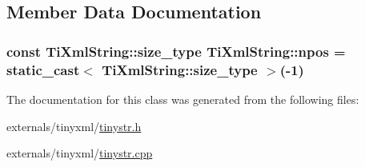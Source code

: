 \subsection{Member Data Documentation}
\hypertarget{class_ti_xml_string_a8f4422d227088dc7bec96f479b275d0a}{
\subsubsection[{npos}]{\setlength{\rightskip}{0pt plus 5cm}const {\bf Ti\-Xml\-String\-::size\-\_\-type} Ti\-Xml\-String\-::npos = static\-\_\-cast$<$ {\bf Ti\-Xml\-String\-::size\-\_\-type} $>$(-\/1)\hspace{0.3cm}{\ttfamily [static]}}}\label{class_ti_xml_string_a8f4422d227088dc7bec96f479b275d0a}


The documentation for this class was generated from the following files\-:\begin{DoxyCompactItemize}
\item 
externals/tinyxml/\hyperlink{tinystr_8h}{tinystr.\-h}\item 
externals/tinyxml/\hyperlink{tinystr_8cpp}{tinystr.\-cpp}\end{DoxyCompactItemize}
